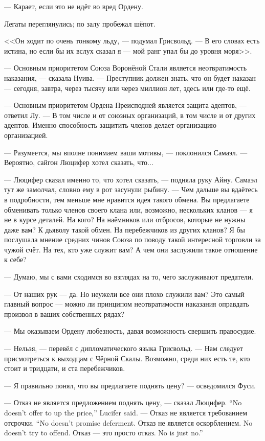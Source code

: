 --- Карает, если это не идёт во вред Ордену.

Легаты переглянулись;
по залу пробежал шёпот.

<<Он ходит по очень тонкому льду, --- подумал Грисвольд.
--- В его словах есть истина, но если бы их вслух сказал я --- мой ранг упал бы до уровня моря>>.

--- Основным приоритетом Союза Воронёной Стали является неотвратимость наказания, --- сказала Нуива.
--- Преступник должен знать, что он будет наказан --- сегодня, завтра, через тысячу или через миллион лет, здесь или где-то ещё.

--- Основным приоритетом Ордена Преисподней является защита адептов, --- ответил Лу.
--- В том числе и от союзных организаций, в том числе и от других адептов.
Именно способность защитить членов делает организацию организацией.

--- Разумеется, мы вполне понимаем ваши мотивы, --- поклонился Самаэл.
--- Вероятно, сайгон Люцифер хотел сказать, что...

--- Люцифер сказал именно то, что хотел сказать, --- подняла руку Айну.
Самаэл тут же замолчал, словно ему в рот засунули рыбину.
--- Чем дальше вы вдаётесь в подробности, тем меньше мне нравится идея такого обмена.
Вы предлагаете обменивать только членов своего клана или, возможно, нескольких кланов --- я не в курсе деталей.
На кого?
На наёмников или отбросов, которые не нужны даже вам?
К дьяволу такой обмен.
На перебежчиков из других кланов?
Я бы послушала мнение средних чинов Союза по поводу такой интересной торговли за чужой счёт.
На тех, кто уже служит вам?
А чем они заслужили такое отношение к себе?

--- Думаю, мы с вами сходимся во взглядах на то, чего заслуживают предатели.

--- От наших рук --- да.
Но неужели все они плохо служили вам?
Это самый главный вопрос --- можно ли принципом неотвратимости наказания оправдать произвол в ваших собственных рядах?

--- Мы оказываем Ордену любезность, давая возможность свершить правосудие.

--- Нельзя, --- перевёл с дипломатического языка Грисвольд.
--- Нам следует присмотреться к выходцам с Чёрной Скалы.
Возможно, среди них есть те, кто стоит и тридцати, и ста перебежчиков.

--- Я правильно понял, что вы предлагаете поднять цену? --- осведомился Фуси.

{--- Отказ не является предложением поднять цену, --- сказал Люцифер.}
{``No doesn't offer to up the price,'' Lucifer said.}
{--- Отказ не является требованием отсрочки.}
{``No doesn't promise deferment.}
{Отказ не является оскорблением.}
{No doesn't try to offend.}
{Отказ --- это просто отказ.}
{No is just no.''}

